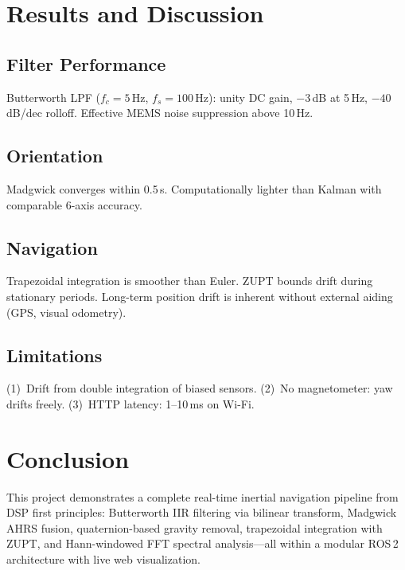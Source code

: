 \documentclass[12pt,a4paper]{article}
\begin{document}
\section{Results and Discussion}

\subsection{Filter Performance}
Butterworth LPF ($f_c\!=\!5$\,Hz, $f_s\!=\!100$\,Hz): unity DC gain, $-3$\,dB at 5\,Hz, $-40$\,dB/dec rolloff. Effective MEMS noise suppression above 10\,Hz.

\subsection{Orientation}
Madgwick converges within 0.5\,s. Computationally lighter than Kalman with comparable 6-axis accuracy.

\subsection{Navigation}
Trapezoidal integration is smoother than Euler. ZUPT bounds drift during stationary periods. Long-term position drift is inherent without external aiding (GPS, visual odometry).

\subsection{Limitations}
(1)~Drift from double integration of biased sensors. (2)~No magnetometer: yaw drifts freely. (3)~HTTP latency: 1--10\,ms on Wi-Fi.

\section{Conclusion}

This project demonstrates a complete real-time inertial navigation pipeline from DSP first principles: Butterworth IIR filtering via bilinear transform, Madgwick AHRS fusion, quaternion-based gravity removal, trapezoidal integration with ZUPT, and Hann-windowed FFT spectral analysis---all within a modular ROS\,2 architecture with live web visualization.

\end{document}
